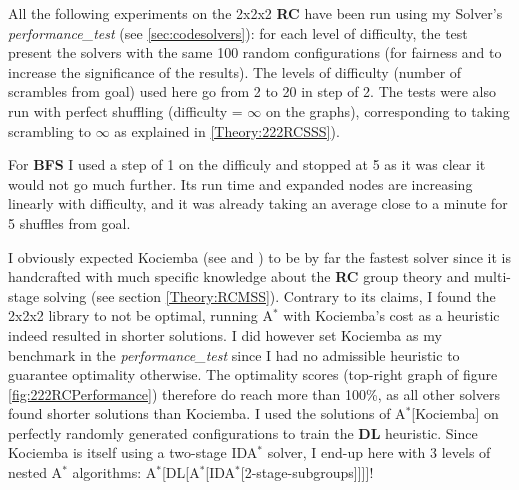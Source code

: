 All the following experiments on the 2x2x2 \textbf{RC} have been run using my Solver's \textit{performance\_test} (see \ref{sec:codesolvers}): for each level of difficulty, the test present the solvers with the same 100 random configurations (for fairness and to increase the significance of the results). The levels of difficulty (number of scrambles from goal) used here go from 2 to 20 in step of 2. The tests were also run with perfect shuffling (difficulty = $\infty$ on the graphs), corresponding to taking scrambling to $\infty$ as explained in \ref{Theory:222RCSSS}).

For \textbf{BFS} I used a step of 1 on the difficuly and stopped at 5 as it was clear it would not go much further. Its run time and expanded nodes are increasing linearly with difficulty, and it was already taking an average close to a minute for 5 shuffles from goal.

I obviously expected Kociemba (see \cite{HKociemba} and \cite{Kociemba}) to be by far the fastest solver since it is handcrafted with much specific knowledge about the \textbf{RC} group theory and multi-stage solving (see section \ref{Theory:RCMSS}). Contrary to its claims, I found the 2x2x2 library to not be optimal, running A$^{*}$ with Kociemba's cost as a heuristic indeed resulted in shorter solutions. I did however set Kociemba as my benchmark in the \textit{performance\_test} since I had no admissible heuristic to guarantee optimality otherwise. The optimality scores (top-right graph of figure \ref{fig:222RCPerformance}) therefore do reach more than 100\%, as all other solvers found shorter solutions than Kociemba. I used the solutions of A$^{*}$[Kociemba] on perfectly randomly generated configurations to train the \textbf{DL} heuristic. Since Kociemba is itself using a two-stage IDA$^{*}$ solver, I end-up here with 3 levels of nested A$^{*}$ algorithms: A$^{*}$[DL[A$^{*}$[IDA$^{*}$[2-stage-subgroups]]]]!







